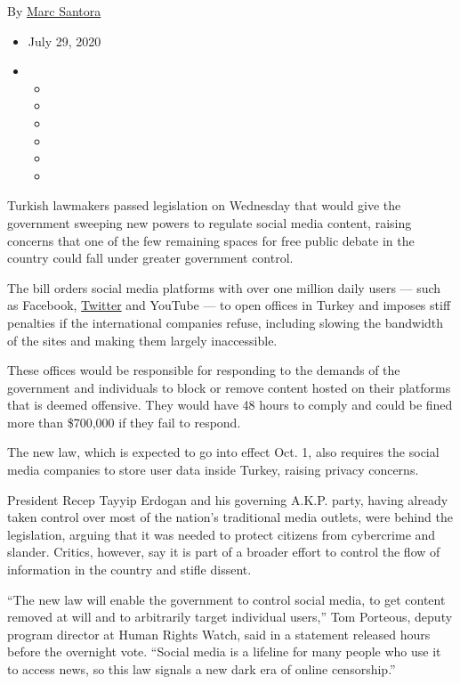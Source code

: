By \href{https://www.nytimes3xbfgragh.onion/by/marc-santora}{Marc
Santora}

\begin{itemize}
\item
  July 29, 2020
\item
  \begin{itemize}
  \item
  \item
  \item
  \item
  \item
  \item
  \end{itemize}
\end{itemize}

Turkish lawmakers passed legislation on Wednesday that would give the
government sweeping new powers to regulate social media content, raising
concerns that one of the few remaining spaces for free public debate in
the country could fall under greater government control.

The bill orders social media platforms with over one million daily users
--- such as Facebook,
\href{https://www.nytimes3xbfgragh.onion/2020/08/03/technology/ftc-twitter-privacy-violations.html}{Twitter}
and YouTube --- to open offices in Turkey and imposes stiff penalties if
the international companies refuse, including slowing the bandwidth of
the sites and making them largely inaccessible.

These offices would be responsible for responding to the demands of the
government and individuals to block or remove content hosted on their
platforms that is deemed offensive. They would have 48 hours to comply
and could be fined more than \$700,000 if they fail to respond.

The new law, which is expected to go into effect Oct. 1, also requires
the social media companies to store user data inside Turkey, raising
privacy concerns.

President Recep Tayyip Erdogan and his governing A.K.P. party, having
already taken control over most of the nation's traditional media
outlets, were behind the legislation, arguing that it was needed to
protect citizens from cybercrime and slander. Critics, however, say it
is part of a broader effort to control the flow of information in the
country and stifle dissent.

``The new law will enable the government to control social media, to get
content removed at will and to arbitrarily target individual users,''
Tom Porteous, deputy program director at Human Rights Watch, said in a
statement released hours before the overnight vote. ``Social media is a
lifeline for many people who use it to access news, so this law signals
a new dark era of online censorship.''

